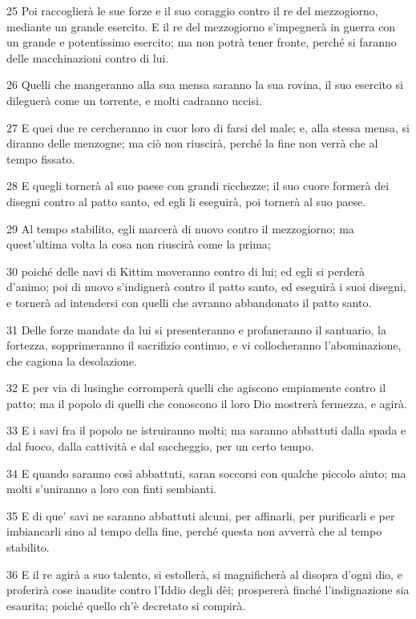 \par 25 Poi raccoglierà le sue forze e il suo coraggio contro il re del mezzogiorno, mediante un grande esercito. E il re del mezzogiorno s'impegnerà in guerra con un grande e potentissimo esercito; ma non potrà tener fronte, perché si faranno delle macchinazioni contro di lui.
\par 26 Quelli che mangeranno alla sua mensa saranno la sua rovina, il suo esercito si dileguerà come un torrente, e molti cadranno uccisi.
\par 27 E quei due re cercheranno in cuor loro di farsi del male; e, alla stessa mensa, si diranno delle menzogne; ma ciò non riuscirà, perché la fine non verrà che al tempo fissato.
\par 28 E quegli tornerà al suo paese con grandi ricchezze; il suo cuore formerà dei disegni contro al patto santo, ed egli li eseguirà, poi tornerà al suo paese.
\par 29 Al tempo stabilito, egli marcerà di nuovo contro il mezzogiorno; ma quest'ultima volta la cosa non riuscirà come la prima;
\par 30 poiché delle navi di Kittim moveranno contro di lui; ed egli si perderà d'animo; poi di nuovo s'indignerà contro il patto santo, ed eseguirà i suoi disegni, e tornerà ad intendersi con quelli che avranno abbandonato il patto santo.
\par 31 Delle forze mandate da lui si presenteranno e profaneranno il santuario, la fortezza, sopprimeranno il sacrifizio continuo, e vi collocheranno l'abominazione, che cagiona la desolazione.
\par 32 E per via di lusinghe corromperà quelli che agiscono empiamente contro il patto; ma il popolo di quelli che conoscono il loro Dio mostrerà fermezza, e agirà.
\par 33 E i savi fra il popolo ne istruiranno molti; ma saranno abbattuti dalla spada e dal fuoco, dalla cattività e dal saccheggio, per un certo tempo.
\par 34 E quando saranno così abbattuti, saran soccorsi con qualche piccolo aiuto; ma molti s'uniranno a loro con finti sembianti.
\par 35 E di que' savi ne saranno abbattuti alcuni, per affinarli, per purificarli e per imbiancarli sino al tempo della fine, perché questa non avverrà che al tempo stabilito.
\par 36 E il re agirà a suo talento, si estollerà, si magnificherà al disopra d'ogni dio, e proferirà cose inaudite contro l'Iddio degli dèi; prospererà finché l'indignazione sia esaurita; poiché quello ch'è decretato si compirà.
